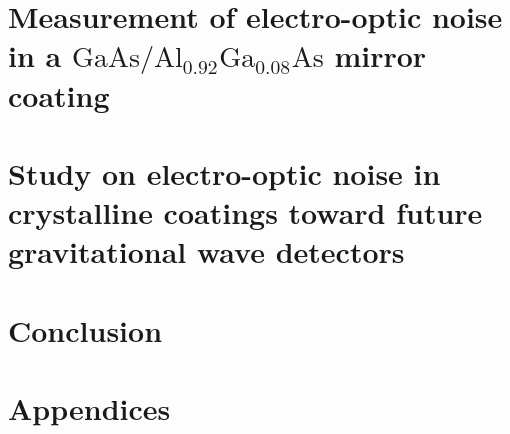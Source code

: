 \documentclass[12pt]{report}
\newcommand{\algaas}{\mathrm{Al_{0.92}Ga_{0.08}As}}
\newcommand{\gaas}{\mathrm{GaAs}}
\begin{document}
\chapter{Measurement of electro-optic noise in a \texorpdfstring{$\gaas / \algaas$}{gaas/algaas} mirror coating}

\newpage

\chapter{Study on electro-optic noise in crystalline coatings toward future gravitational wave detectors}

\newpage 

\chapter{Conclusion}

\newpage

\chapter*{Appendices} 




\end{document}
